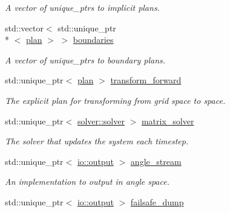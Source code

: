 \begin{DoxyCompactItemize}
\begin{DoxyCompactList}\small\item\em A vector of unique\-\_\-ptrs to implicit plans. \end{DoxyCompactList}\item 
\hypertarget{classelement_1_1element_a66f8967810f632df8f3701b3004624b4}{std\-::vector$<$ std\-::unique\-\_\-ptr\\*
$<$ \hyperlink{classplan}{plan} $>$ $>$ \hyperlink{classelement_1_1element_a66f8967810f632df8f3701b3004624b4}{boundaries}}\label{classelement_1_1element_a66f8967810f632df8f3701b3004624b4}

\begin{DoxyCompactList}\small\item\em A vector of unique\-\_\-ptrs to boundary plans. \end{DoxyCompactList}\item 
\hypertarget{classelement_1_1element_af5eab156aef098e5efd95e8625d30bed}{std\-::unique\-\_\-ptr$<$ \hyperlink{classplan}{plan} $>$ \hyperlink{classelement_1_1element_af5eab156aef098e5efd95e8625d30bed}{transform\-\_\-forward}}\label{classelement_1_1element_af5eab156aef098e5efd95e8625d30bed}

\begin{DoxyCompactList}\small\item\em The explicit plan for transforming from grid space to space. \end{DoxyCompactList}\item 
\hypertarget{classelement_1_1element_a99bd235c956c6c40b6a08528f4310c85}{std\-::unique\-\_\-ptr$<$ \hyperlink{classsolver_1_1solver}{solver\-::solver} $>$ \hyperlink{classelement_1_1element_a99bd235c956c6c40b6a08528f4310c85}{matrix\-\_\-solver}}\label{classelement_1_1element_a99bd235c956c6c40b6a08528f4310c85}

\begin{DoxyCompactList}\small\item\em The solver that updates the system each timestep. \end{DoxyCompactList}\item 
\hypertarget{classelement_1_1element_a88e72ffe095917725f6e6f3bcf1e0587}{std\-::unique\-\_\-ptr$<$ \hyperlink{classio_1_1output}{io\-::output} $>$ \hyperlink{classelement_1_1element_a88e72ffe095917725f6e6f3bcf1e0587}{angle\-\_\-stream}}\label{classelement_1_1element_a88e72ffe095917725f6e6f3bcf1e0587}

\begin{DoxyCompactList}\small\item\em An implementation to output in angle space. \end{DoxyCompactList}\item 
\hypertarget{classelement_1_1element_a07d4ca3ff51f89a420cf5a7de6f74bc4}{std\-::unique\-\_\-ptr$<$ \hyperlink{classio_1_1output}{io\-::output} $>$ \hyperlink{classelement_1_1element_a07d4ca3ff51f89a420cf5a7de6f74bc4}{failsafe\-\_\-dump}}\label{classelement_1_1element_a07d4ca3ff51f89a420cf5a7de6f74bc4}


\end{DoxyCompactItemize}

